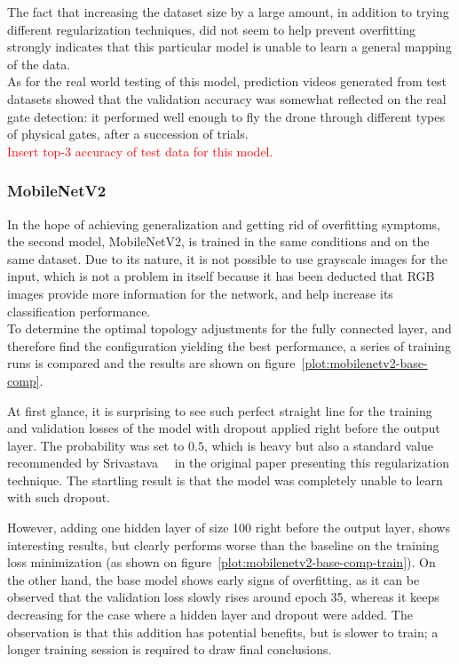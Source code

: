The fact that increasing the dataset size by a large amount, in addition to
trying different regularization techniques, did not seem to help prevent
overfitting strongly indicates that this particular model is unable to
learn a general mapping of the data.\\

As for the real world testing of this model, prediction videos generated from
test datasets showed that the validation accuracy was somewhat reflected on the
real gate detection: it performed well enough to fly the drone through
different types of physical gates, after a succession of trials.\\

\textcolor{red}{Insert top-3 accuracy of test data for this model.}

\subsubsection{MobileNetV2}

In the hope of achieving generalization and getting rid of overfitting
symptoms, the second model, MobileNetV2, is trained in the same conditions and
on the same dataset. Due to its nature, it is not possible to use grayscale
images for the input, which is not a problem in itself because it has been
deducted that RGB images provide more information for the network, and help
increase its classification performance.\\

To determine the optimal topology adjustments for the fully connected layer,
and therefore find the configuration yielding the best performance, a series of
training runs is compared and the results are shown on
figure~\ref{plot:mobilenetv2-base-comp}.



At first glance, it is surprising to see such perfect straight line for the
training and validation losses of the model with dropout applied right before
the output layer. The probability was set to $0.5$, which is heavy but also a
standard value recommended by Srivastava~\etal~\cite{Dropout} in the original
paper presenting this regularization technique. The startling result is that
the model was completely unable to learn with such dropout.

However, adding one hidden layer of size 100 right before the output layer,
shows interesting results, but clearly performs worse than the baseline on the
training loss minimization (as shown on
figure~\ref{plot:mobilenetv2-base-comp-train}).  On the other hand, the base
model shows early signs of overfitting, as it can be observed that the
validation loss slowly rises around epoch 35, whereas it keeps decreasing for
the case where a hidden layer and dropout were added. The observation is that
this addition has potential benefits, but is slower to train; a longer training
session is required to draw final conclusions.


